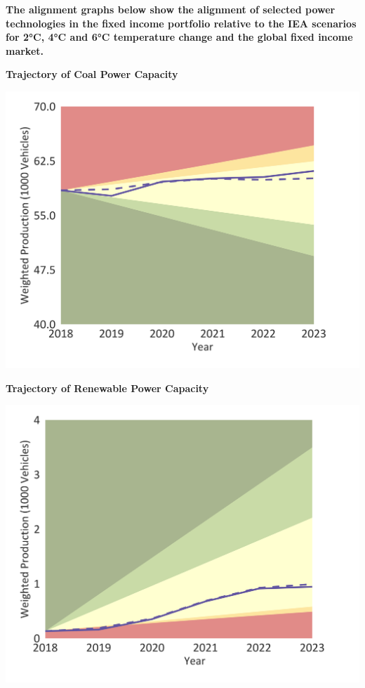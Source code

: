 \documentclass[10pt,table,a4]{article}\usepackage[]{graphicx}\usepackage[]{color}
\begin{document}
	\begin{multicols}{2}
		\textbf{The alignment graphs below show the alignment of selected power technologies in the fixed income portfolio relative to the IEA scenarios for 2°C, 4°C and 6°C temperature change and the global fixed income market.} 
		
	\end{multicols}	
	
	
	
	\begin{minipage}[t]{.49\linewidth}
		\textbf{Trajectory of Coal Power Capacity }
		
		\includegraphics[trim = {0 0cm 0 0},width=1\linewidth]{CAFigures/Fig14}
		
		\textbf{Trajectory of Renewable Power Capacity }
		
		\includegraphics[trim = {0 0cm 0 0},width=.99\linewidth]{CAFigures/Fig15}
	\end{minipage}	
\end{document}
